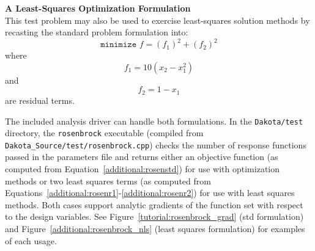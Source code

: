 {\bf A Least-Squares Optimization Formulation} \\
This test problem
may also be used to exercise least-squares solution methods by
recasting the standard problem formulation into:
\begin{equation}
\texttt{minimize } f = (f_1)^2+(f_2)^2 \label{additional:rosenls}
\end{equation}
where
\begin{equation}
f_1 = 10 (x_2 - x_1^2) \label{additional:rosenr1}
\end{equation}
and
\begin{equation}
f_2 = 1 - x_1 \label{additional:rosenr2}
\end{equation}
are residual terms.

The included analysis driver can handle both formulations.
In the \texttt{Dakota/test} directory, the \texttt{rosenbrock}
executable (compiled from \texttt{Dakota\_Source/test/rosenbrock.cpp}) checks the number of
response functions passed in the parameters file and returns either an
objective function (as computed from
Equation~\ref{additional:rosenstd}) for use with optimization methods
or two least squares terms (as computed from
Equations~\ref{additional:rosenr1}-\ref{additional:rosenr2}) for use
with least squares methods. Both cases support analytic gradients of
the function set with respect to the design variables.
See Figure~\ref{tutorial:rosenbrock_grad} (std formulation)
and Figure~\ref{additional:rosenbrock_nls} (least squares formulation)
for examples of each usage.


